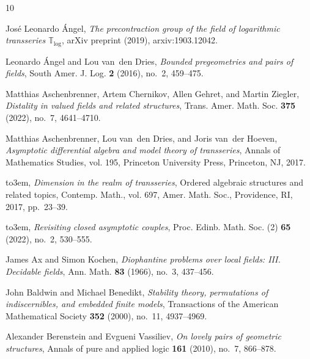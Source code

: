 \documentclass[11pt]{amsart}
\theoremstyle{plain}
\theoremstyle{definition}
\numberwithin{equation}{section}
\newcommand\0{\varnothing}
\begin{document}
\providecommand{\bysame}{\leavevmode\hbox to3em{\hrulefill}\thinspace}
\providecommand{\href}[2]{#2}
\begin{thebibliography}{10}

Jos\'e Leonardo \'Angel, \emph{The precontraction group of the field of logarithmic transseries $\mathbb{T}_{\log}$}, arXiv preprint
  (2019), arxiv:1903.12042.

Leonardo \'Angel and Lou van~den Dries, \emph{Bounded pregeometries and pairs
  of fields}, South Amer. J. Log. \textbf{2} (2016), no.~2, 459--475.

Matthias Aschenbrenner, Artem Chernikov, Allen Gehret, and Martin Ziegler,
  \emph{Distality in valued fields and related structures}, Trans. Amer. Math.
  Soc. \textbf{375} (2022), no.~7, 4641--4710.

Matthias Aschenbrenner, Lou van~den Dries, and Joris van~der Hoeven,
  \emph{Asymptotic differential algebra and model theory of transseries},
  Annals of Mathematics Studies, vol. 195, Princeton University Press,
  Princeton, NJ, 2017.

\bysame, \emph{Dimension in the realm of transseries}, Ordered algebraic
  structures and related topics, Contemp. Math., vol. 697, Amer. Math. Soc.,
  Providence, RI, 2017, pp.~23--39.

\bysame, \emph{Revisiting closed asymptotic couples}, Proc. Edinb. Math. Soc.
  (2) \textbf{65} (2022), no.~2, 530--555.

James Ax and Simon Kochen, \emph{Diophantine problems over local fields: {III}.
  {D}ecidable fields}, Ann. Math. \textbf{83} (1966), no.~3, 437--456.

John Baldwin and Michael Benedikt, \emph{Stability theory, permutations of
  indiscernibles, and embedded finite models}, Transactions of the American
  Mathematical Society \textbf{352} (2000), no.~11, 4937--4969.

Alexander Berenstein and Evgueni Vassiliev, \emph{On lovely pairs of geometric
  structures}, Annals of pure and applied logic \textbf{161} (2010), no.~7,
  866--878.


\end{thebibliography}
\end{document}
